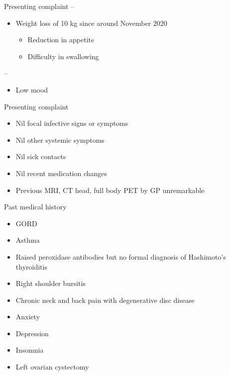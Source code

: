 \documentclass[
  ignorenonframetext,
]{beamer}
\providecommand{\tightlist}{%
  \setlength{\itemsep}{0pt}\setlength{\parskip}{0pt}}
\begin{document}
\begin{frame}{Presenting complaint}
--

\begin{itemize}
\tightlist
\item
  Weight loss of 10 kg since around November 2020

  \begin{itemize}
  \tightlist
  \item
    Reduction in appetite
  \item
    Difficulty in swallowing
  \end{itemize}
\end{itemize}

--

\begin{itemize}
\tightlist
\item
  Low mood
\end{itemize}
\end{frame}

\begin{frame}{Presenting complaint}
\protect\hypertarget{presenting-complaint-1}{}
\begin{itemize}
\tightlist
\item
  Nil focal infective signs or symptoms
\item
  Nil other systemic symptoms
\item
  Nil sick contacts
\item
  Nil recent medication changes
\item
  Previous MRI, CT head, full body PET by GP unremarkable
\end{itemize}
\end{frame}

\begin{frame}{Past medical history}
\protect\hypertarget{past-medical-history}{}
\begin{itemize}
\tightlist
\item
  GORD
\item
  Asthma
\item
  Raised peroxidase antibodies but no formal diagnosis of Hashimoto's
  thyroiditis
\item
  Right shoulder bursitis
\item
  Chronic neck and back pain with degenerative disc disease
\item
  Anxiety
\item
  Depression
\item
  Insomnia
\item
  Left ovarian cystectomy
\end{itemize}
\end{frame}
\end{document}
